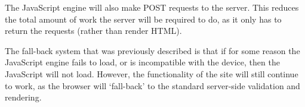 The JavaScript engine will also make POST requests to the server. This reduces 
the total amount of work the server will be required to do, as it only has to 
return the requests (rather than render HTML).

The fall-back system that was previously described is that if for some reason 
the JavaScript engine fails to load, or is incompatible with the device, then 
the JavaScript will not load. However, the functionality of the site will still 
continue to work, as the browser will `fall-back' to the standard server-side 
validation and rendering.
